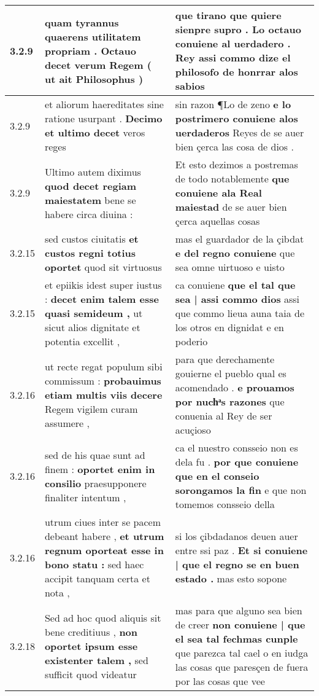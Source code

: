 \begin{tabular}{|p{1cm}|p{6.5cm}|p{6.5cm}|}
3.2.9 & quam tyrannus quaerens utilitatem propriam . \textbf{ Octauo decet verum Regem } ( ut ait Philosophus ) & que tirano que quiere sienpre supro . \textbf{ Lo octauo conuiene al uerdadero . } Rey assi commo dize el philosofo de honrrar alos sabios \\\hline
3.2.9 & et aliorum haereditates sine ratione usurpant . \textbf{ Decimo et ultimo decet } veros reges & sin razon ¶Lo de zeno \textbf{ e lo postrimero conuiene alos uerdaderos } Reyes de se auer bien çerca las cosa de dios . \\\hline
3.2.9 & Ultimo autem diximus \textbf{ quod decet regiam maiestatem } bene se habere circa diuina : & Et esto dezimos a postremas de todo notablemente \textbf{ que conuiene ala Real maiestad } de se auer bien çerca aquellas cosas \\\hline
3.2.15 & sed custos ciuitatis \textbf{ et custos regni totius oportet } quod sit virtuosus & mas el guardador de la çibdat \textbf{ e del regno conuiene } que sea omne uirtuoso e uisto \\\hline
3.2.15 & et epiikis idest super iustus : \textbf{ decet enim talem esse quasi semideum , } ut sicut alios dignitate et potentia excellit , & ca conuiene \textbf{ que el tal que sea | assi commo dios } assi que commo lieua auna taia de los otros en dignidat e en poderio \\\hline
3.2.16 & ut recte regat populum sibi commissum : \textbf{ probauimus etiam multis viis decere } Regem vigilem curam assumere , & para que derechamente gouierne el pueblo qual es acomendado . \textbf{ e prouamos por nuchͣs razones } que conuenia al Rey de ser acuçioso \\\hline
3.2.16 & sed de his quae sunt ad finem : \textbf{ oportet enim in consilio } praesupponere finaliter intentum , & ca el nuestro consseio non es dela fu . \textbf{ por que conuiene que en el conseio sorongamos la fin } e que non tomemos consseio della \\\hline
3.2.16 & utrum ciues inter se pacem debeant habere , \textbf{ et utrum regnum oporteat esse in bono statu : } sed haec accipit tanquam certa et nota , & si los çibdadanos deuen auer entre ssi paz . \textbf{ Et si conuiene | que el regno se en buen estado . } mas esto sopone \\\hline
3.2.18 & Sed ad hoc quod aliquis sit bene creditiuus , \textbf{ non oportet ipsum esse existenter talem , } sed sufficit quod videatur & mas para que alguno sea bien de creer \textbf{ non conuiene | que el sea tal fechmas cunple } que parezca tal cael o en iudga las cosas que paresçen de fuera por las cosas que vee \\\hline

\end{tabular}

